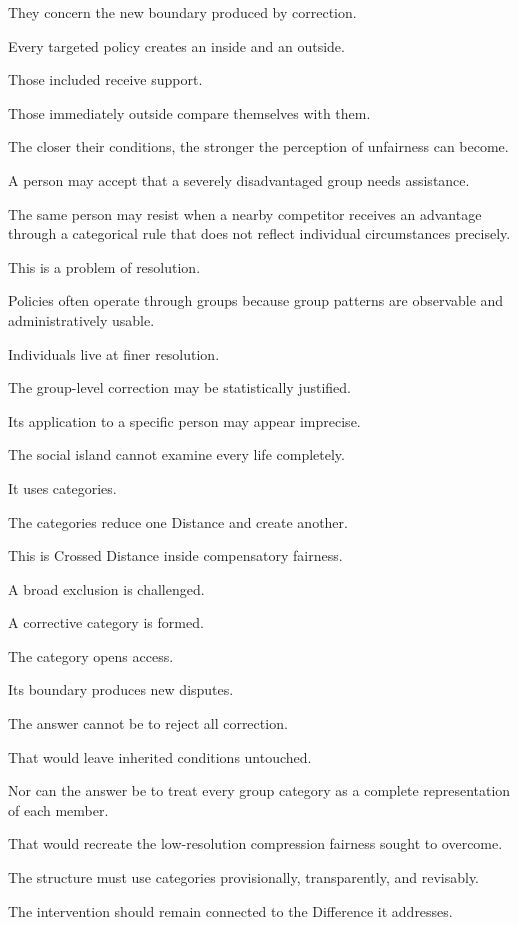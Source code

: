 They concern the new boundary produced by correction.

Every targeted policy creates an inside and an outside.

Those included receive support.

Those immediately outside compare themselves with them.

The closer their conditions, the stronger the perception of unfairness can become.

A person may accept that a severely disadvantaged group needs assistance.

The same person may resist when a nearby competitor receives an advantage through a categorical rule that does not reflect individual circumstances precisely.

This is a problem of resolution.

Policies often operate through groups because group patterns are observable and administratively usable.

Individuals live at finer resolution.

The group-level correction may be statistically justified.

Its application to a specific person may appear imprecise.

The social island cannot examine every life completely.

It uses categories.

The categories reduce one Distance and create another.

This is Crossed Distance inside compensatory fairness.

A broad exclusion is challenged.

A corrective category is formed.

The category opens access.

Its boundary produces new disputes.

The answer cannot be to reject all correction.

That would leave inherited conditions untouched.

Nor can the answer be to treat every group category as a complete representation of each member.

That would recreate the low-resolution compression fairness sought to overcome.

The structure must use categories provisionally, transparently, and revisably.

The intervention should remain connected to the Difference it addresses.

